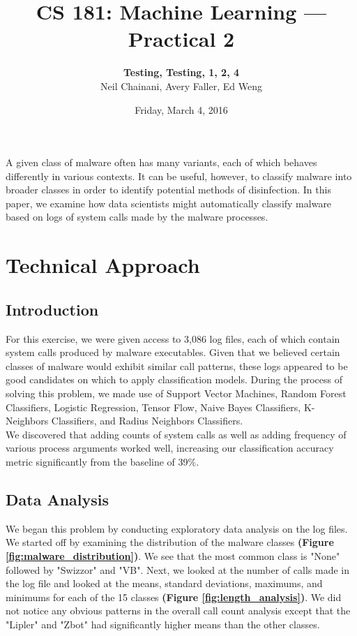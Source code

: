 \documentclass[11pt]{article}
\author{{\bf Testing, Testing, 1, 2, 4} \medskip \\ Neil Chainani, Avery Faller, Ed Weng}
\title{CS 181: Machine Learning --- Practical 2}
\date{Friday, March 4, 2016}
\begin{document}
\maketitle

\noindent A given class of malware often has many variants, each of which behaves differently in various contexts. It can be useful, however, to classify malware into broader classes in order to identify potential methods of disinfection. In this paper, we examine how data scientists might automatically classify malware based on logs of system calls made by the malware processes.

\section{Technical Approach}

\subsection{Introduction}
For this exercise, we were given access to 3,086 log files, each of which contain system calls produced by malware executables. Given that we believed certain classes of malware would exhibit similar call patterns, these logs appeared to be good candidates on which to apply classification models. During the process of solving this problem, we made use of Support Vector Machines, Random Forest Classifiers, Logistic Regression, Tensor Flow, Naive Bayes Classifiers, K-Neighbors Classifiers, and Radius Neighbors Classifiers.\\

We discovered that adding counts of system calls as well as adding frequency of various process arguments worked well, increasing our classification accuracy metric significantly from the baseline of 39\%.

\subsection{Data Analysis}
We began this problem by conducting exploratory data analysis on the log files. We started off by examining the distribution of the malware classes \textbf{(Figure \ref{fig:malware_distribution})}. We see that the most common class is "None" followed by "Swizzor" and "VB". Next, we looked at the number of calls made in the log file and looked at the means, standard deviations, maximums, and minimums for each of the 15 classes \textbf{(Figure \ref{fig:length_analysis})}. We did not notice any obvious patterns in the overall call count analysis except that the "Lipler" and "Zbot" had significantly higher means than the other classes.\\
\end{document}
